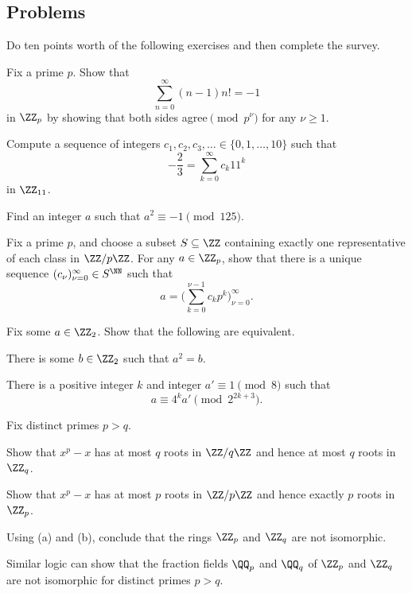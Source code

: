 \documentclass[../notes.tex]{subfiles}
\begin{document}
\subsection{Problems}
Do ten points worth of the following exercises and then complete the survey.
\begin{prob}[2 points]
	Fix a prime $p$. Show that
	\[\sum_{n=0}^\infty(n-1)n!=-1\]
	in $\ZZ_p$ by showing that both sides agree$\pmod{p^\nu}$ for any $\nu\ge1$.
\end{prob}
\begin{prob}[2 points]
	Compute a sequence of integers $c_1,c_2,c_3,\ldots\in\{0,1,\ldots,10\}$ such that
	\[-\frac23=\sum_{k=0}^\infty c_k11^k\]
	in $\ZZ_{11}$.
\end{prob}
\begin{prob}[3 points]
	Find an integer $a$ such that $a^2\equiv-1\pmod{125}$.
\end{prob}
\begin{prob}[3 points]
	Fix a prime $p$, and choose a subset $S\subseteq\ZZ$ containing exactly one representative of each class in $\ZZ/p\ZZ$. For any $a\in\ZZ_p$, show that there is a unique sequence $(c_\nu)_{\nu=0}^\infty\in S^\NN$ such that
	\[a=\Bigg(\sum_{k=0}^{\nu-1}c_kp^k\Bigg)_{\nu=0}^\infty.\]
\end{prob}
\begin{prob}[3 points]
	Fix some $a\in\ZZ_2$. Show that the following are equivalent.
	\begin{listalph}
		\item There is some $b\in\ZZ_2$ such that $a^2=b$.
		\item There is a positive integer $k$ and integer $a'\equiv1\pmod8$ such that
		\[a\equiv 4^ka'\pmod{2^{2k+3}}.\]
	\end{listalph}
\end{prob}
\begin{prob}[4 points]
	Fix distinct primes $p>q$.
	\begin{listalph}
		\item Show that $x^p-x$ has at most $q$ roots in $\ZZ/q\ZZ$ and hence at most $q$ roots in $\ZZ_q$.
		\item Show that $x^p-x$ has at most $p$ roots in $\ZZ/p\ZZ$ and hence exactly $p$ roots in $\ZZ_p$.
		\item Using (a) and (b), conclude that the rings $\ZZ_p$ and $\ZZ_q$ are not isomorphic.
	\end{listalph}
	Similar logic can show that the fraction fields $\QQ_p$ and $\QQ_q$ of $\ZZ_p$ and $\ZZ_q$ are not isomorphic for distinct primes $p>q$.
\end{prob}
\end{document}
